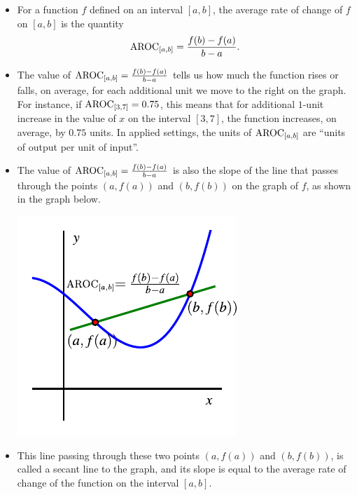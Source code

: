 \documentclass[nooutcomes]{ximera}
\begin{document}
\begin{summary}\begin{itemize}
\item For a function $f$ defined on an interval $[a,b]$, the average rate of change of $f$ on $[a,b]$ is the quantity%
\begin{equation*}
\mathrm{AROC}_{[a,b]} = \frac{f(b) - f(a)}{b-a}\text{.}
\end{equation*}
\item The value of $\mathrm{AROC}_{[a,b]} = \frac{f(b) - f(a)}{b-a}$ tells us how much the function rises or falls, on average, for each additional unit we move to the right on the graph.  For instance, if $\mathrm{AROC}_{[3,7]} = 0.75$, this means that for additional $1$-unit increase in the value of $x$ on the interval $[3,7]$, the function increases, on average, by $0.75$ units.  In applied settings, the units of $\mathrm{AROC}_{[a,b]}$ are ``units of output per unit of input''.
\item The value of $\mathrm{AROC}_{[a,b]} = \frac{f(b) - f(a)}{b-a}$ is also the slope of the line that passes through the points $(a,f(a))$ and $(b,f(b))$ on the graph of $f$, as shown in the graph below.
\begin{image}
\includegraphics{aroc-f-x-defn.pdf}
\end{image}

\item This line passing through these two points $(a,f(a))$ and $(b,f(b))$, is called a secant line to the graph, and its slope is equal to the average rate of change of the function on the interval $[a,b]$.

\end{itemize}\end{summary}
\end{document}
